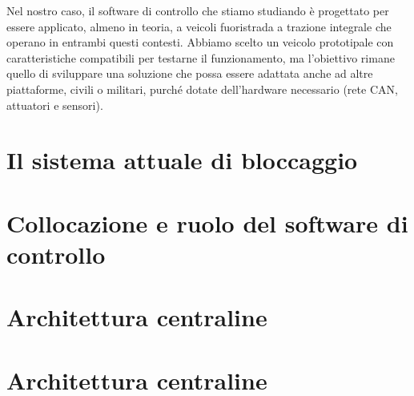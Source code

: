 \documentclass[11pt]{report}
\begin{document}
	Nel nostro caso, il software di controllo che stiamo studiando è progettato per essere applicato, almeno in teoria, a veicoli fuoristrada a trazione integrale che operano in entrambi questi contesti. Abbiamo scelto un veicolo prototipale con caratteristiche compatibili per testarne il funzionamento, ma l’obiettivo rimane quello di sviluppare una soluzione che possa essere adattata anche ad altre piattaforme, civili o militari, purché dotate dell’hardware necessario (rete CAN, attuatori e sensori).
	
	
	
	
	\section{Il sistema attuale di bloccaggio}
	\section{Collocazione e ruolo del software di controllo}
	\section{Architettura centraline}
	\section{Architettura centraline}
	
	
	\printbibliography


	
\end{document}
